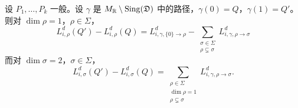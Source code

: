 \begin{lemma}
设 $P_1,\ldots,P_k$ 一般。设 $\gamma$ 是 $M_{\mathbb{R}}\setminus\operatorname{Sing}(\mathfrak D)$ 中的路径，$\gamma(0)=Q$，$\gamma(1)=Q'$。则对 $\dim\rho=1$，$\rho\in\Sigma$，
\begin{equation}
  L^d_{i,\rho}(Q')-L^d_{i,\rho}(Q)
  =L^d_{i,\gamma,\{0\}\to\rho}-\sum_{\substack{\sigma\in\Sigma\\ \rho\subsetneq\sigma}}L^d_{i,\gamma,\rho\to\sigma} \tag{5.34}
\end{equation}
而对 $\dim\sigma=2$，$\sigma\in\Sigma$，
\begin{equation}
  L^d_{i,\sigma}(Q')-L^d_{i,\sigma}(Q)
  =\sum_{\substack{\rho\in\Sigma\\ \dim\rho=1\\ \rho\subsetneq\sigma}}L^d_{i,\gamma,\rho\to\sigma}. \tag{5.35}
\end{equation}
\end{lemma}

